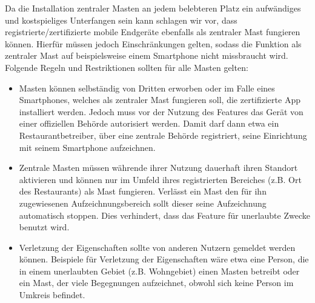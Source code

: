 \documentclass[conference,compsoc]{IEEEtran}
\begin{document}
Da die Installation zentraler Masten an jedem belebteren Platz ein aufwändiges und kostspieliges Unterfangen sein kann schlagen wir vor, dass registrierte/zertifizierte mobile Endgeräte ebenfalls als zentraler Mast fungieren können. 
Hierfür müssen jedoch Einschränkungen gelten, sodass die Funktion als zentraler Mast auf beispielsweise einem Smartphone nicht missbraucht wird.
Folgende Regeln und Restriktionen sollten für alle Masten gelten:
\begin{itemize}
	\item Masten können selbständig von Dritten erworben oder im Falle eines Smartphones, welches als zentraler Mast fungieren soll, die zertifizierte App installiert werden. 
	Jedoch muss vor der Nutzung des Features das Gerät von einer offiziellen Behörde autorisiert werden. Damit darf dann etwa ein Restaurantbetreiber, über eine zentrale Behörde registriert, seine Einrichtung mit seinem Smartphone aufzeichnen. 
	\item Zentrale Masten müssen währende ihrer Nutzung dauerhaft ihren Standort aktivieren und können nur im Umfeld ihres registrierten Bereiches (z.B. Ort des Restaurants) als Mast fungieren. 
	Verlässt ein Mast den für ihn zugewiesenen Aufzeichnungsbereich sollt dieser seine Aufzeichnung automatisch stoppen. Dies verhindert, dass das Feature für unerlaubte Zwecke benutzt wird.
	\item Verletzung der Eigenschaften sollte von anderen Nutzern gemeldet werden können. 
	Beispiele für Verletzung der Eigenschaften wäre etwa eine Person, die in einem unerlaubten Gebiet (z.B. Wohngebiet) einen Masten betreibt oder ein Mast, der viele Begegnungen aufzeichnet, obwohl sich keine Person im Umkreis befindet.  
\end{itemize}
\end{document}
